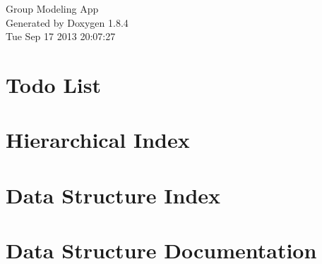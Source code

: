 \documentclass[twoside]{book}
\newcommand{\clearemptydoublepage}{%
  \newpage{\pagestyle{empty}\cleardoublepage}%
}
\begin{document}
\hypersetup{pageanchor=false}
\begin{titlepage}
\vspace*{7cm}
\begin{center}%
{\Large Group Modeling App }\\
\vspace*{1cm}
{\large Generated by Doxygen 1.8.4}\\
\vspace*{0.5cm}
{\small Tue Sep 17 2013 20:07:27}\\
\end{center}
\end{titlepage}
\clearemptydoublepage
\tableofcontents
\clearemptydoublepage
{}
\hypersetup{pageanchor=true}

\chapter{Todo List}
\label{todo}
\hypertarget{todo}{}

\chapter{Hierarchical Index}

\chapter{Data Structure Index}

\chapter{Data Structure Documentation}































\newpage
{}
{}
\printindex
\end{document}
